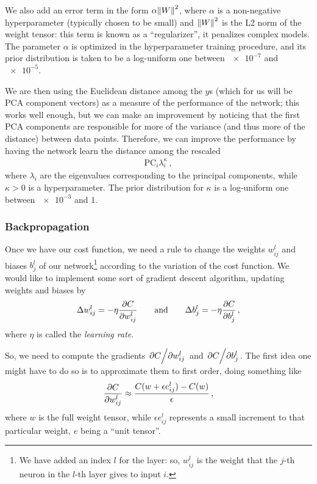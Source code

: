 \documentclass[main.tex]{subfiles}
\begin{document}
We also add an error term in the form \(\alpha \norm{W}^2\), where \(\alpha \) is a non-negative hyperparameter (typically chosen to be small) and \(\norm{W}^2\) is the L2 norm of the weight tensor: this term is known as a ``regularizer'', it penalizes complex models.
The parameter \(\alpha \) is optimized in the hyperparameter training procedure, and its prior distribution is taken to be a log-uniform one between \(\num{e-7}\) and \(\num{e-5}\). 

We are then using the Euclidean distance among the \(y\)s (which for us will be PCA component vectors) as a measure of the performance of the network; this works well enough, but we can make an improvement by noticing that the first PCA components are responsible for more of the variance (and thus more of the distance) between data points. 
Therefore, we can improve the performance by having the network learn the distance among the rescaled 
%
\begin{align}
\text{PC}_i \lambda_i^{\kappa }
\,,
\end{align}
%
where \(\lambda _i\) are the eigenvalues corresponding to the principal components, while \(\kappa > 0\) is a hyperparameter.
The prior distribution for \(\kappa \) is a log-uniform one between \(\num{e-3}\) and \(1\). 

\subsubsection{Backpropagation}

Once we have our cost function, we need a rule to change the weights \(w_{ij}^{l}\) and biases \(b_{j}^{l}\) of our network\footnote{We have added an index \(l\) for the layer: so, \(w_{ij}^{l}\) is the weight that the \(j\)-th neuron in the \(l\)-th layer gives to input \(i\).} according to the variation of the cost function. 
We would like to implement some sort of gradient descent algorithm, updating weights and biases by
%
\begin{align} \label{eq:gradient-descent-basic}
\Delta w_{ij}^{l} = - \eta \pdv{C}{w_{ij}^{l}} 
\qquad \text{and} \qquad
\Delta b_{j}^{l} = - \eta \pdv{C}{b_{j}^{l}}
\,,
\end{align}
%
where \(\eta \) is called the \emph{learning rate}. 

So, we need to compute the gradients \(\pdv*{C}{w_{ij}^{l}}\) and \(\pdv*{C}{b_{j}^{l}}\). 
The first idea one might have to do so is to approximate them to first order, doing something like 
%
\begin{align}
\pdv{C}{w_{ij}^{l}} \approx \frac{C(w + \epsilon e_{ij}^{l}) - C (w)}{\epsilon }
\,,
\end{align}
%
where \(w\) is the full weight tensor, while \(\epsilon e_{ij}^{l}\) represents a small increment to that particular weight, \(e\) being a ``unit tensor''.
\end{document}

